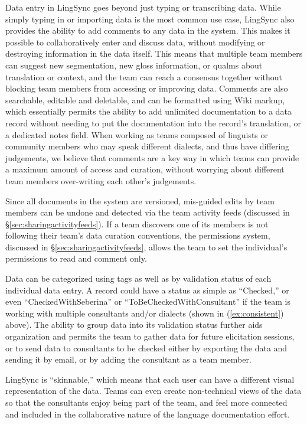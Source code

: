 \documentclass[letterpaper, 12pt, dvips]{mitwpl}
\begin{document}
Data entry in LingSync goes beyond just typing or transcribing data.
While simply typing in or importing data is the most common use case,
LingSync also provides the ability to add comments to any data in the system.
This makes it possible to collaboratively enter and discuss data,
without modifying or destroying information in the data itself.
This means that multiple team members can suggest new segmentation,
new gloss information,
or qualms about translation or context,
and the team can reach a consensus together without blocking team members from accessing or improving data.
Comments are also searchable, editable and deletable,
and can be formatted using Wiki markup, which essentially permits the ability to add unlimited documentation to a data record without needing to put the documentation into the record's   translation, or a dedicated notes field.
When working as teams composed of linguists or community members who may speak different dialects,
and thus have differing judgements,
we believe that comments are a key way in which teams can provide a maximum amount of access and curation,
without worrying about different team members over-writing each other's judgements.


Since all documents in the system are versioned,
mis-guided edits by team members can be undone and detected via the team activity feeds (discussed in \S \ref{sec:sharingactivityfeeds}).
If a team discovers one of its members is not following their team's data curation conventions,
the permissions system, discussed in \S \ref{sec:sharingactivityfeeds}, allows the team to set the individual's permissions to read and comment only.
 

Data can be categorized using tags as well as by validation status of each individual data entry.
A record could have a status as simple as ``Checked,'' or even ``CheckedWithSeberina'' or ``ToBeCheckedWithConsultant'' if the team is working with multiple consultants and/or dialects (shown in (\ref{ex:consistent}) above).
The ability to group data into its validation status further aids organization and permits the team to gather data for future elicitation sessions,
or to send data to consultants to be checked either by exporting the data and sending it by email,
or by adding the consultant as a team member. 

LingSync is ``skinnable,''
which means that each user can have a different visual representation of the data.
Teams can even create non-technical views of the data so that the consultants enjoy being part of the team, and feel more connected and included in  the collaborative nature of the language documentation effort.
\end{document}

